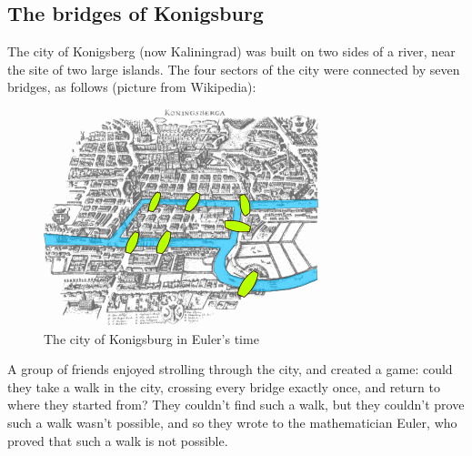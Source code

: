 \documentclass[10pt,]{book}
\theoremstyle{plain}
\theoremstyle{definition}
\theoremstyle{definition}
\theoremstyle{definition}
\theoremstyle{definition}
\numberwithin{equation}{section}
\begin{document}
\subsection[{The bridges of Konigsburg}]{The bridges of Konigsburg}\label{subsection-16}
\hypertarget{p-115}{}%
The city of Konigsberg (now Kaliningrad) was built on two sides of a river, near the site of two large islands.   The four sectors of the city were connected by seven bridges, as follows (picture from Wikipedia):%
\begin{figure}
\centering
\includegraphics[width=0.7\linewidth]{images/Konigsberg_bridges.png}
\caption{The city of Konigsburg in Euler's time\label{bridges_konigsberg}}
\end{figure}
\hypertarget{p-116}{}%
A group of friends enjoyed strolling through the city, and created a game: could they take a walk in the city, crossing every bridge exactly once, and return to where they started from? They couldn't find such a walk, but they couldn't prove such a walk wasn't possible, and so they wrote to the mathematician Euler, who proved that such a walk is not possible.%
\typeout{************************************************}
\typeout{************************************************}
\end{document}

